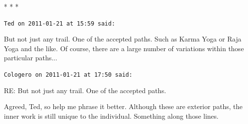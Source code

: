 
\begin{center}* * *\end{center}

\begin{footnotesize}
\begin{sffamily}
\texttt{Ted on 2011-01-21 at 15:59 said:}

But not just any trail. One of the accepted paths. Such as Karma Yoga or Raja Yoga and the like. Of course, there are a large number of variations within those particular paths... 

\hfill

\texttt{Cologero on 2011-01-21 at 17:50 said:}

RE: But not just any trail. One of the accepted paths.

Agreed, Ted, so help me phrase it better. Although these are exterior paths, the inner work is still unique to the individual. Something along those lines.


\hfill

\end{sffamily}
\end{footnotesize}

